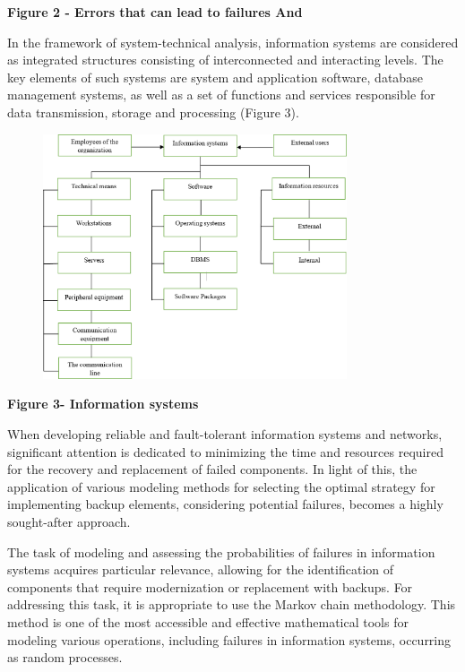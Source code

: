 \textbf{Figure 2 - Errors that can lead to failures And}

In the framework of system-technical analysis, information systems are
considered as integrated structures consisting of interconnected and
interacting levels. The key elements of such systems are system and
application software, database management systems, as well as a set of
functions and services responsible for data transmission, storage and
processing (Figure 3).

\begin{figure}[H]
	\centering
	\includegraphics[width=0.8\textwidth]{assets/45}
	\caption*{}
\end{figure}

\textbf{Figure 3- Information systems}

When developing reliable and fault-tolerant information systems and
networks, significant attention is dedicated to minimizing the time and
resources required for the recovery and replacement of failed
components. In light of this, the application of various modeling
methods for selecting the optimal strategy for implementing backup
elements, considering potential failures, becomes a highly sought-after
approach.

The task of modeling and assessing the probabilities of failures in
information systems acquires particular relevance, allowing for the
identification of components that require modernization or replacement
with backups. For addressing this task, it is appropriate to use the
Markov chain methodology. This method is one of the most accessible and
effective mathematical tools for modeling various operations, including
failures in information systems, occurring as random processes.

